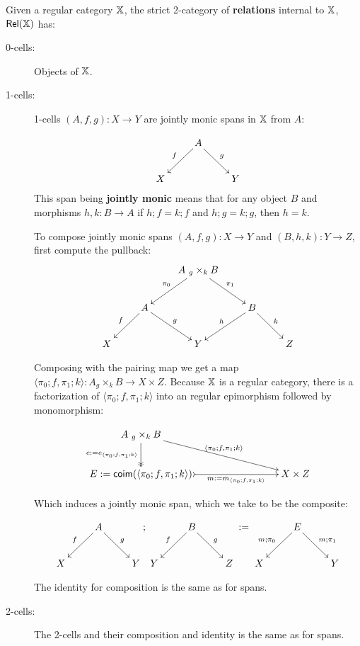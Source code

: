 \begin{definition}
Given a regular category $\mathbb{X}$,  the strict 2-category of {\bf relations} internal to $\mathbb{X}$, $\mathsf{Rel}(\mathbb{X})$ has:

\begin{description}
\item[0-cells:] Objects of $\mathbb{X}$.
\item[1-cells:] 1-cells $(A,f,g):X\to Y$ are jointly monic spans in $\mathbb{X}$ from $A$:


$$
\xymatrix{
    & A \ar[dl]_{f} \ar[dr]^{g}
    &
  \\X 
    &
    & Y
}
$$
This span being {\bf jointly monic} means that for any object $B$ and morphisms $h,k:B\to A$ if $h;f=k;f$ and $h;g=k;g$, then $h=k$.

To compose jointly monic spans $(A,f,g):X\to Y$ and $(B,h,k):Y\to Z$,  first compute the pullback:
$$
\xymatrix{
    &
    & A\ {}_g\times_k B \ar[dl]_{\pi_0} \ar[dr]^{\pi_1}
    &
    &
  \\
    & A \ar[dl]_{f} \ar[dr]^{g}
    &
    & B \ar[dl]_{h} \ar[dr]^{k}
    &
  \\X
    &
    & Y
    &
    & Z
}
$$

Composing with the pairing map we get a map $\langle \pi_0;f,\pi_1;k\rangle :A {}_g\times_k B \to X\times Z$.
Because $\mathbb{X}$ is a regular category, there is a factorization of $\langle \pi_0;f,\pi_1;k\rangle$ into an regular epimorphism followed by monomorphism:

$$
\xymatrix{
  A\ {}_g\times_k B \ar[drrr]^{\langle \pi_0;f,\pi_1;k\rangle}  \ar@{->>}[d]_{e:=e_{\langle \pi_0;f,\pi_1;k\rangle} }
  \\  E:=\co\im({\langle \pi_0;f,\pi_1;k\rangle} ) \ar@{>->}[rrr]_{\ \ \ \ \ \ \ \ \ \ \ m:=m_{\langle \pi_0;f,\pi_1;k\rangle} }
    &&&  X\times Z
}
$$

Which induces a jointly monic span, which we take to be the composite:

$$
\xymatrix{
    & A \ar[dl]_{f} \ar[dr]^{g}
    &
  \\X 
    &
    & Y
};
\xymatrix{
    & B \ar[dl]_{f} \ar[dr]^{g}
    &
  \\Y 
    &
    & Z
}
:=
\xymatrix{
    &E  \ar[dl]_{m;\pi_0} \ar[dr]^{m;\pi_1}
    &
  \\X 
    &
    & Y
}
$$

The identity for composition is the same as for spans.

\item[2-cells:] The 2-cells and their composition and identity is the same as for spans.

\end{description}

\end{definition}


